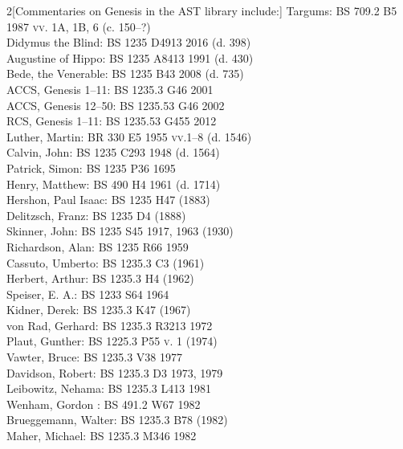 \documentclass[titlepage]{article}
\begin{document}
\begin{multicols}{2}[Commentaries on Genesis in the AST library include:]%
\footnotesize\noindent
Targums: {\scshape BS 709.2 B5 1987 vv. 1A, 1B, 6} (c. 150--?)\\
Didymus the Blind: {\scshape BS 1235 D4913 2016} (d. 398)\\
Augustine of Hippo: {\scshape BS 1235 A8413 1991} (d. 430)\\
Bede, the Venerable: {\scshape BS 1235 B43 2008} (d. 735)\\
ACCS, Genesis 1--11: {\scshape BS 1235.3 G46 2001}\\
ACCS, Genesis 12--50: {\scshape BS 1235.53 G46 2002}\\
RCS, Genesis 1--11: {\scshape BS 1235.53 G455 2012}\\
Luther, Martin: {\scshape BR 330 E5 1955 vv.1--8} (d. 1546)\\
Calvin, John: {\scshape BS 1235 C293 1948} (d. 1564)\\
Patrick, Simon: {\scshape BS 1235 P36 1695}\\
Henry, Matthew: {\scshape BS 490 H4 1961} (d. 1714)\\
Hershon, Paul Isaac: {\scshape BS 1235 H47} (1883)\\
Delitzsch, Franz: {\scshape BS 1235 D4} (1888)\\
Skinner, John: {\scshape BS 1235 S45 1917, 1963} (1930)\\
Richardson, Alan: {\scshape BS 1235 R66 1959}\\
Cassuto, Umberto: {\scshape BS 1235.3 C3} (1961)\\
Herbert, Arthur: {\scshape BS 1235.3 H4} (1962)\\
Speiser, E. A.: {\scshape BS 1233 S64 1964}\\
Kidner, Derek: {\scshape BS 1235.3 K47} (1967)\\
von Rad, Gerhard: {\scshape BS 1235.3 R3213 1972}\\
Plaut, Gunther: {\scshape BS 1225.3 P55 v. 1} (1974)\\
Vawter, Bruce: {\scshape BS 1235.3 V38 1977}\\
Davidson, Robert: {\scshape BS 1235.3 D3 1973, 1979}\\
Leibowitz, Nehama: {\scshape BS 1235.3 L413 1981}\\
Wenham, Gordon : {\scshape BS 491.2 W67 1982}\\
Brueggemann, Walter: {\scshape BS 1235.3 B78} (1982)\\
Maher, Michael: {\scshape BS 1235.3 M346 1982}\\

\end{multicols}
\end{document}
